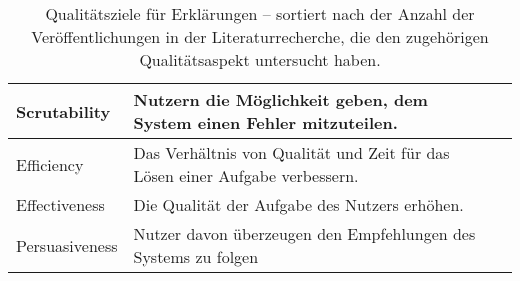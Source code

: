 \begin{table}[htb!]
\begin{center}
\begin{tabular}{|p{}|p{}|p{}|}
            Scrutability                & Nutzern die Möglichkeit geben, dem System einen Fehler mitzuteilen. 
                                        & \cite{nunes_systematic_2017} \cite{chazette_knowledge_nodate} \cite{tintarev_designing_nodate} \cite{balog_measuring_2020} \cite{tintarev2015explaining} \cite{martin_developing_2019} \cite{gunning2019darpa}  \cite{tintarev2007survey} \cite{martin_evaluating_2021} \\ \hline
            Efficiency                  & Das Verhältnis von Qualität und Zeit für das Lösen einer Aufgabe verbessern.
                                        & \cite{nunes_systematic_2017} \cite{chazette_knowledge_nodate} \cite{tintarev_designing_nodate} \cite{balog_measuring_2020} \cite{tsai_evaluating_2019} \cite{tintarev2015explaining} \cite{hernandez-bocanegra_effects_2020} \cite{tintarev2007survey}\\ \hline
            Effectiveness               & Die Qualität der Aufgabe des Nutzers erhöhen.
                                        & \cite{nunes_systematic_2017} \cite{chazette_knowledge_nodate} \cite{tintarev_designing_nodate} \cite{balog_measuring_2020} \cite{tintarev2015explaining} \cite{zolotas_towards_2019} \cite{hernandez-bocanegra_effects_2020} \cite{martin_evaluating_2021} \cite{rjoob_towards_2021} \cite{tintarev2007survey} \\ \hline
            Persuasiveness              & Nutzer davon überzeugen den Empfehlungen des Systems zu folgen
                                        & \cite{nunes_systematic_2017} \cite{tintarev_designing_nodate} \cite{balog_measuring_2020} \cite{sato_context_nodate} \cite{sato_context_nodate} \cite{abdulrahman_belief-based_2019} \cite{tintarev2015explaining} \cite{sato_action-triggering_2019} \cite{tintarev2007survey} \\ \hline
        \end{tabular}
    \end{center}
    \caption{Qualitätsziele für Erklärungen – sortiert nach der Anzahl der Veröffentlichungen in der Literaturrecherche, die den zugehörigen Qualitätsaspekt untersucht haben.}
    \label{tab:quality_aspects_of_explanation}
\end{table}

